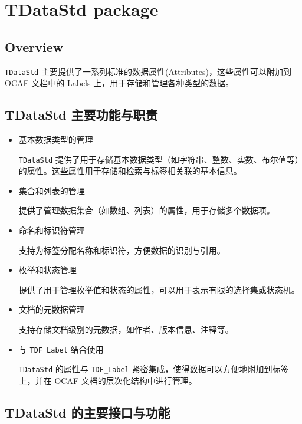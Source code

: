 \documentclass[11pt]{article}
\begin{document}
\section{TDataStd package}
\label{sec:org5d64f4e}

\subsection{Overview}
\label{sec:org207e8c0}

\texttt{TDataStd} 主要提供了一系列标准的数据属性(Attributes)，这些属性可以附加到 OCAF 文档中的 Labels 上，用于存储和管理各种类型的数据。
\subsection{TDataStd 主要功能与职责}
\label{sec:orgb2a9e41}

\begin{itemize}
\item 基本数据类型的管理

\texttt{TDataStd} 提供了用于存储基本数据类型（如字符串、整数、实数、布尔值等）的属性。这些属性用于存储和检索与标签相关联的基本信息。

\item 集合和列表的管理

提供了管理数据集合（如数组、列表）的属性，用于存储多个数据项。

\item 命名和标识符管理

支持为标签分配名称和标识符，方便数据的识别与引用。

\item 枚举和状态管理

提供了用于管理枚举值和状态的属性，可以用于表示有限的选择集或状态机。

\item 文档的元数据管理

支持存储文档级别的元数据，如作者、版本信息、注释等。

\item 与 \texttt{TDF\_Label} 结合使用

\texttt{TDataStd} 的属性与 \texttt{TDF\_Label} 紧密集成，使得数据可以方便地附加到标签上，并在 OCAF 文档的层次化结构中进行管理。
\end{itemize}
\subsection{TDataStd 的主要接口与功能}
\label{sec:orgdcd5be6}
\end{document}
